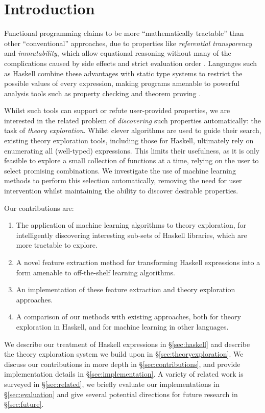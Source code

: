 \section{Introduction}

Functional programming claims to be more ``mathematically tractable'' than other ``conventional'' approaches, due to properties like \emph{referential transparency} and \emph{immutability}, which allow equational reasoning without many of the complications caused by side effects and strict evaluation order \cite{hughes1989functional}. Languages such as Haskell combine these advantages with static type systems to restrict the possible values of every expression, making programs amenable to powerful analysis tools such as property checking \cite{claessen2011quickcheck} and theorem proving \cite{rosen2012proving}.

Whilst such tools can support or refute user-provided properties, we are interested in the related problem of \emph{discovering} such properties automatically: the task of \emph{theory exploration}. Whilst clever algorithms are used to guide their search, existing theory exploration tools, including those for Haskell, ultimately rely on enumerating all (well-typed) expressions. This limits their usefulness, as it is only feasible to explore a small collection of functions at a time, relying on the user to select promising combinations. We investigate the use of machine learning methods to perform this selection automatically, removing the need for user intervention whilst maintaining the ability to discover desirable properties.

Our contributions are:

\begin{enumerate}
  \item The application of machine learning algorithms to theory exploration, for intelligently discovering interesting sub-sets of Haskell libraries, which are more tractable to explore.
  \item A novel feature extraction method for transforming Haskell expressions into a form amenable to off-the-shelf learning algorithms.
  \item An implementation of these feature extraction and theory exploration approaches.
  \item A comparison of our methods with existing approaches, both for theory exploration in Haskell, and for machine learning in other languages.
\end{enumerate}

We describe our treatment of Haskell expressions in \S \ref{sec:haskell} and describe the \qspec{} theory exploration system we build upon in \S \ref{sec:theoryexploration}. We discuss our contributions in more depth in \S \ref{sec:contributions}, and provide implementation details in \S \ref{sec:implementation}. A variety of related work is surveyed in \S \ref{sec:related}, we briefly evaluate our implementations in \S \ref{sec:evaluation} and give several potential directions for future research in \S \ref{sec:future}.
